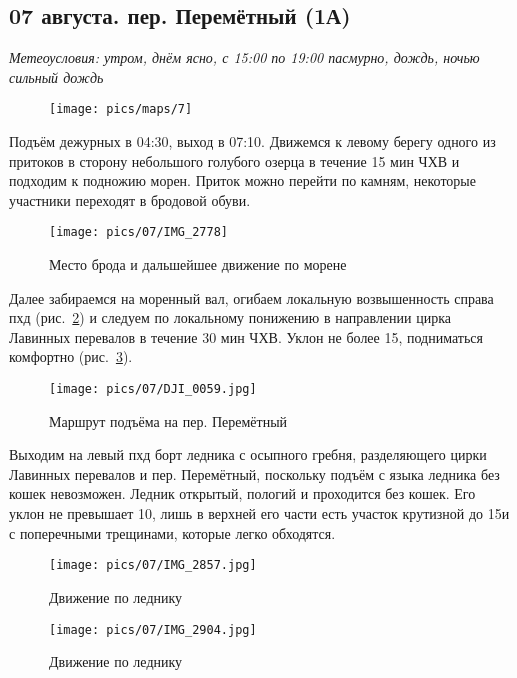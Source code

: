 \subsection{07 августа. пер. Перемётный (1А)}
\textit{Метеоусловия: утром, днём ясно, с 15:00 по 19:00 пасмурно, дождь, ночью сильный дождь}

\begin{figure}[h!]
	\centering
	\texttt{[image: pics/maps/7]}
	\label{fig:7}
\end{figure}

Подъём дежурных в 04:30, выход в 07:10. Движемся к левому берегу одного из притоков в сторону небольшого голубого озерца в течение 15 мин ЧХВ и подходим к подножию морен. Приток можно перейти по камням, некоторые участники переходят в бродовой обуви.

\begin{figure}[h!]
	\centering
	\texttt{[image: pics/07/IMG\_2778]}
	\caption{Место брода и дальшейшее движение по морене}
	\label{fig:img2778}
\end{figure}

Далее забираемся на моренный вал, огибаем локальную возвышенность справа пхд (рис.~\ref{fig:img2778}) и следуем по локальному понижению в направлении цирка Лавинных перевалов в течение 30 мин ЧХВ. Уклон не более 15\degree, подниматься комфортно (рис.~\ref{fig:DJI_0059.jpg}).

\begin{figure}[h!]
	\centering
	\texttt{[image: pics/07/DJI\_0059.jpg]}
	\caption{Маршрут подъёма на пер. Перемётный}
	\label{fig:DJI_0059.jpg}
\end{figure}

Выходим на левый пхд борт ледника с осыпного гребня, разделяющего цирки Лавинных перевалов и пер. Перемётный, поскольку подъём с языка ледника без кошек невозможен. Ледник открытый, пологий и проходится без кошек. Его уклон не превышает 10\degree, лишь в верхней его части есть участок крутизной до 15\degree и с поперечными трещинами, которые легко обходятся.

\begin{figure}[h!]
	\centering
	\texttt{[image: pics/07/IMG\_2857.jpg]}
	\caption{Движение по леднику}
	\label{fig:IMG_2857.jpg}
\end{figure}

\begin{figure}[h!]
	\centering
	\texttt{[image: pics/07/IMG\_2904.jpg]}
	\caption{Движение по леднику}
	\label{fig:IMG_2904.jpg}
\end{figure}

